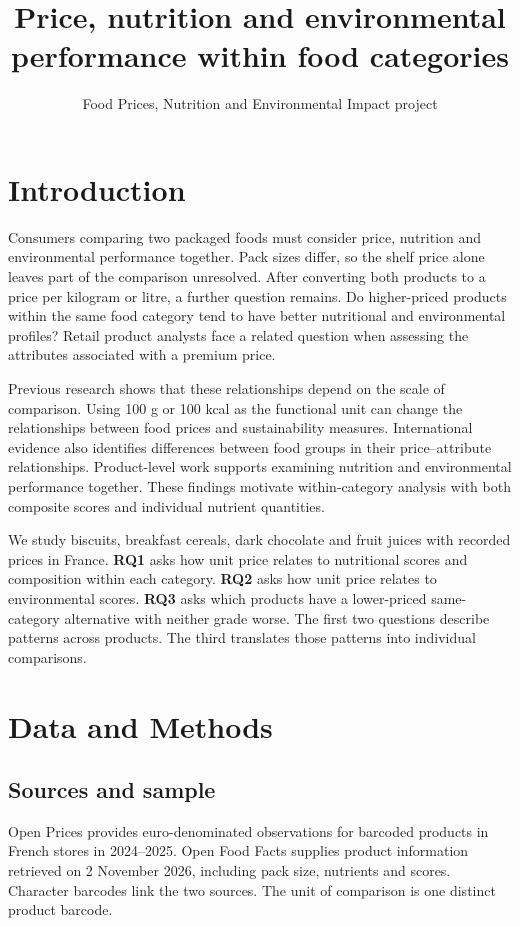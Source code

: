 \documentclass[11pt,a4paper,onecolumn,oneside]{tau-class/tau}
\title{Price, nutrition and environmental performance within food categories}
\author{Food Prices, Nutrition and Environmental Impact project}
\begin{document}
\maketitle\thispagestyle{firststyle}
\section{Introduction}
Consumers comparing two packaged foods must consider price, nutrition and environmental performance together. Pack sizes differ, so the shelf price alone leaves part of the comparison unresolved. After converting both products to a price per kilogram or litre, a further question remains. Do higher-priced products within the same food category tend to have better nutritional and environmental profiles? Retail product analysts face a related question when assessing the attributes associated with a premium price.

Previous research shows that these relationships depend on the scale of comparison. Using 100 g or 100 kcal as the functional unit can change the relationships between food prices and sustainability measures\cite{masset2015}. International evidence also identifies differences between food groups in their price--attribute relationships\cite{martinez2025}. Product-level work supports examining nutrition and environmental performance together\cite{clark2022}. These findings motivate within-category analysis with both composite scores and individual nutrient quantities.

We study biscuits, breakfast cereals, dark chocolate and fruit juices with recorded prices in France. \textbf{RQ1} asks how unit price relates to nutritional scores and composition within each category. \textbf{RQ2} asks how unit price relates to environmental scores. \textbf{RQ3} asks which products have a lower-priced same-category alternative with neither grade worse. The first two questions describe patterns across products. The third translates those patterns into individual comparisons.

\section{Data and Methods}
\subsection{Sources and sample}
Open Prices provides euro-denominated observations for barcoded products in French stores in 2024--2025. Open Food Facts supplies product information retrieved on 2 November 2026, including pack size, nutrients and scores. Character barcodes link the two sources. The unit of comparison is one distinct product barcode.
\end{document}
